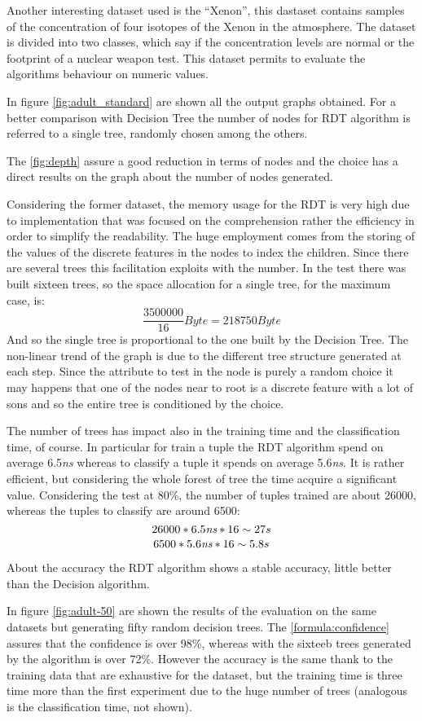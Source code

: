 \documentclass{acm_proc_article-sp-sigmod07}
\begin{document}
Another interesting dataset used is the ``Xenon'', this dastaset contains
samples of the concentration of four isotopes of the Xenon in the
atmosphere. The dataset is divided into two classes, which say if the
concentration levels are normal or the footprint of a nuclear weapon test.
This dataset permits to evaluate the algorithms behaviour on numeric
values.

In figure \ref{fig:adult_standard} are shown all the output graphs
obtained.  For a better comparison with Decision Tree the number of nodes
for RDT algorithm is referred to a single tree, randomly chosen among the
others.

The \ref{fig:depth} assure a good reduction in terms of nodes and the
choice has a direct results on the graph about the number of nodes
generated.

Considering the former dataset, the memory usage for the RDT is very high
due to implementation that was focused on the comprehension rather the
efficiency in order to simplify the readability. The huge employment comes
from the storing of the values of the discrete features in the nodes to
index the children. Since there are several trees this facilitation
exploits with the number. In the test there was built sixteen trees, so the
space allocation for a single tree, for the maximum case, is:
$$ \frac{3500000}{16} Byte = 218750 Byte$$
And so the single tree is proportional to the one built by the Decision
Tree. The non-linear trend of the graph is due to the different tree
structure generated at each step. Since the attribute to test in the node
is purely a random choice it may happens that one of the nodes near to
root is a discrete feature with a lot of sons and so the entire tree is
conditioned by the choice.

The number of trees has impact also in the training time and the
classification time, of course. In particular for train a tuple the RDT
algorithm spend on average 6.5\emph{ns} whereas to classify a tuple it
spends on average 5.6\emph{ns}. It is rather efficient, but considering
the whole forest of tree the time acquire a significant value. Considering
the test at 80\%, the number of tuples trained are about 26000, whereas the
tuples
to classify are around 6500:
$$
26000 * 6.5\emph{ns} * 16 \sim 27 s
$$
$$
 6500 * 5.6\emph{ns} * 16 \sim 5.8 s
$$

About the accuracy the RDT algorithm shows a stable accuracy, little
better than the Decision algorithm.

In figure \ref{fig:adult-50} are shown the results of the evaluation on
the same datasets but generating fifty random decision trees. The
\ref{formula:confidence} assures that the confidence is over 98\%, whereas
with the sixteeb trees generated  by the algorithm is over 72\%. However
the accuracy is the same thank to the training data that are exhaustive
for the dataset, but the training time is three time more than the first
experiment due to the huge number of trees (analogous is the
classification time, not shown).
\end{document}
